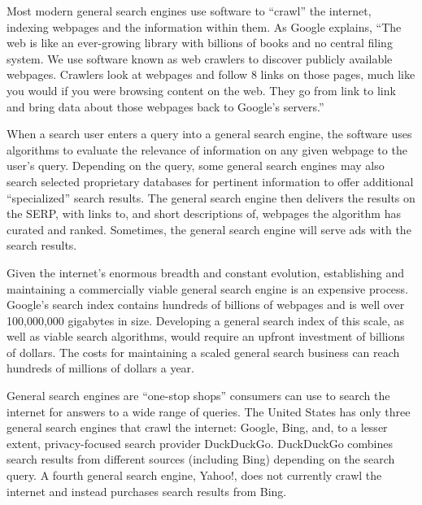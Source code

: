 \documentclass[11pt,b5paper]{scrartcl}
\begin{document}

Most modern general search engines use software to “crawl” the internet,
indexing webpages and the information within them. As Google explains, “The web is like an
ever-growing library with billions of books and no central filing system. We use software known
as web crawlers to discover publicly available webpages. Crawlers look at webpages and follow
8
links on those pages, much like you would if you were browsing content on the web. They go
from link to link and bring data about those webpages back to Google’s servers.”


When a search user enters a query into a general search engine, the software uses
algorithms to evaluate the relevance of information on any given webpage to the user’s query.
Depending on the query, some general search engines may also search selected proprietary
databases for pertinent information to offer additional “specialized” search results. The general
search engine then delivers the results on the SERP, with links to, and short descriptions of,
webpages the algorithm has curated and ranked. Sometimes, the general search engine will serve
ads with the search results.


Given the internet’s enormous breadth and constant evolution, establishing and
maintaining a commercially viable general search engine is an expensive process. Google’s
search index contains hundreds of billions of webpages and is well over 100,000,000 gigabytes
in size. Developing a general search index of this scale, as well as viable search algorithms,
would require an upfront investment of billions of dollars. The costs for maintaining a scaled
general search business can reach hundreds of millions of dollars a year.


General search engines are “one-stop shops” consumers can use to search the
internet for answers to a wide range of queries. The United States has only three general search
engines that crawl the internet: Google, Bing, and, to a lesser extent, privacy-focused search
provider DuckDuckGo. DuckDuckGo combines search results from different sources (including
Bing) depending on the search query. A fourth general search engine, Yahoo!, does not currently
crawl the internet and instead purchases search results from Bing.

\end{document}
